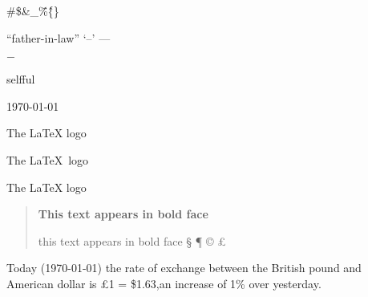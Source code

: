 \documentclass[12pt,twoside,twocolumn,a4paper]{article}   %
\begin{document}
	\#\$\&\_\"\%\^\{\}

	``father-in-law'' `--' ---

	$-$

	selfful
	
	\today

	The \LaTeX{} logo

	The \LaTeX\ logo

	The {\LaTeX} logo

	\begin{quote}
		{\bfseries This text appears in bold face}

		\setlength{\parindent}{0.5cm} this text appears in bold face
		\setlength{\textwidth}{12.5cm}
			\S 
			\ddag 
			\P
			\copyright 
			\pounds			
	\end{quote}
	Today (\today) the rate of exchange between the British pound and American dollar is \pounds 1 = \$1.63,an increase of 1\% over yesterday.
\end{document}
